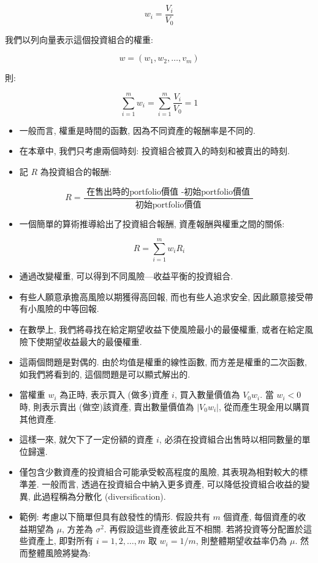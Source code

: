 \documentclass[letterpaper]{article}
\begin{document}
		$$
		w_{i}=\frac{V_{i}}{V_{0}}
		$$
		
		我們以列向量表示這個投資組合的權重: 
		
		$$
		w=\left (w_{1}, w_{2}, \ldots, v_{m}\right)
		$$
		
		則: 
		
		$$
		\sum_{i=1}^{m} w_{i}=\sum_{i=1}^{m} \frac{V_{i}}{V_{0}}=1
		$$
		
		\begin{itemize}
			\item 一般而言, 權重是時間的函數, 因為不同資產的報酬率是不同的. 
			\item 在本章中, 我們只考慮兩個時刻: 投資組合被買入的時刻和被賣出的時刻. 
			\item 記 $R$ 為投資組合的報酬: 
		\end{itemize}
		
		$$
		R=\frac{\text { 在售出時的portfolio價值 -初始portfolio價值 }}{\text { 初始portfolio價值 }}
		$$
		
		\begin{itemize}
			\item 一個簡單的算術推導給出了投資組合報酬, 資產報酬與權重之間的關係: 
		\end{itemize}
		
		$$
		R=\sum_{i=1}^{m} w_{i} R_{i}
		$$
		
		\begin{itemize}
			\item 通過改變權重, 可以得到不同風險—收益平衡的投資組合.   
			\item 有些人願意承擔高風險以期獲得高回報, 而也有些人追求安全, 因此願意接受帶有小風險的中等回報.   
			\item 在數學上, 我們將尋找在給定期望收益下使風險最小的最優權重, 或者在給定風險下使期望收益最大的最優權重.   
			\item 這兩個問題是對偶的. 由於均值是權重的線性函數, 而方差是權重的二次函數, 如我們將看到的, 這個問題是可以顯式解出的.   
			\item 當權重 $w_{i}$ 為正時, 表示買入 (做多)資產 $i$, 買入數量價值為 $V_{0} w_{i}$.   
			當 $w_{i}<0$ 時, 則表示賣出 (做空)該資產, 賣出數量價值為 $\left|V_{0} w_{i}\right|$, 從而產生現金用以購買其他資產.   
			
			\item 這樣一來, 就欠下了一定份額的資產 $i$, 必須在投資組合出售時以相同數量的單位歸還.   
			
			\item 僅包含少數資產的投資組合可能承受較高程度的風險, 其表現為相對較大的標準差. 一般而言, 透過在投資組合中納入更多資產, 可以降低投資組合收益的變異, 此過程稱為分散化 (diversification).   
			
			\item 範例: 考慮以下簡單但具有啟發性的情形. 假設共有 $m$ 個資產, 每個資產的收益期望為 $\mu$, 方差為 $\sigma^{2}$. 再假設這些資產彼此互不相關. 若將投資等分配置於這些資產上, 即對所有 $i=1, 2, \ldots, m$ 取 $w_{i}=1/m$, 則整體期望收益率仍為 $\mu$. 然而整體風險將變為: 
			
		\end{itemize}
		
\end{document}
